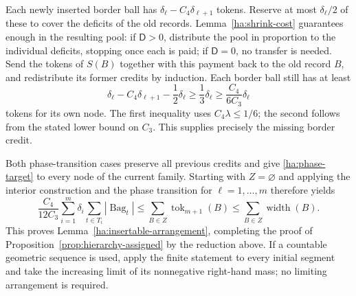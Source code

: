 Each newly inserted border ball has
$\delta_\ell-C_4\delta_{\ell+1}$ tokens.  Reserve at most
$\delta_\ell/2$ of these to cover the deficits of the old records.
Lemma~\ref{ha:shrink-cost} guarantees enough in the resulting pool:
if $\mathsf D>0$, distribute the pool in proportion to the individual
deficits, stopping once each is paid; if $\mathsf D=0$, no transfer is
needed.  Send the tokens of $S(B)$ together with this payment back
to the old record $B$, and redistribute its former credits by
induction.  Each border ball still has at least
\[
 \delta_\ell-C_4\delta_{\ell+1}-\frac12\delta_\ell
 \ge\frac13\delta_\ell
 \ge\frac{C_4}{6C_3}\delta_\ell
\]
tokens for its own node.  The first inequality uses
$C_4\lambda\le1/6$; the second follows from the stated lower bound
on $C_3$.  This supplies precisely the missing border credit.

Both phase-transition cases preserve all previous credits and
give \eqref{ha:phase-target} to every node of the current family.
Starting with $Z=\varnothing$ and applying the interior construction
and the phase transition for $\ell=1,\ldots,m$ therefore yields
\[
 \frac{C_4}{12C_3}
 \sum_{i=1}^m\delta_i\sum_{t\in T_i}|\operatorname{Bag}_t|
 \le\sum_{B\in Z}\operatorname{tok}_{m+1}(B)
 \le\sum_{B\in Z}\operatorname{width}(B).
\]
This proves Lemma~\ref{ha:insertable-arrangement}, completing the
proof of Proposition~\ref{prop:hierarchy-assigned} by the reduction
above.  If a countable geometric sequence is used, apply the finite
statement to every initial segment and take the increasing limit
of its nonnegative right-hand mass; no limiting arrangement is
required.
